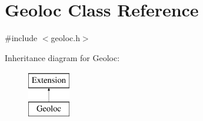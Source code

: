 \hypertarget{classGeoloc}{
\section{Geoloc Class Reference}
\label{classGeoloc}
}


{\ttfamily \#include $<$geoloc.h$>$}

Inheritance diagram for Geoloc:\begin{figure}[H]
\begin{center}
\leavevmode
\includegraphics[height=2.000000cm]{classGeoloc}
\end{center}
\end{figure}
